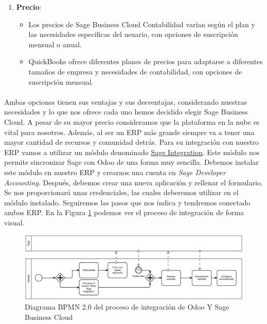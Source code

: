 \begin{enumerate}
\item \textbf{Precio}:
   \begin{itemize}
       \item Los precios de Sage Business Cloud Contabilidad varían según el plan y las necesidades específicas del usuario, con opciones de suscripción mensual o anual.
       \item QuickBooks ofrece diferentes planes de precios para adaptarse a diferentes tamaños de empresa y necesidades de contabilidad, con opciones de suscripción mensual.
   \end{itemize}

\end{enumerate}

\paragraph{}
Ambas opciones tienen sus ventajas y sus desventajas, considerando nuestras necesidades y lo que nos ofrece cada uno hemos decidido elegir Sage Business Cloud. A pesar de su mayor precio consideramos que la plataforma en la nube es vital para nosotros. Además, al ser un ERP más grande siempre va a tener una mayor cantidad de recursos y comunidad detrás. Para su integración con nuestro ERP vamos a utilizar un módulo denominado \href{https://apps.odoo.com/apps/modules/14.0/odoo_sage_integration/}{Sage Integration}. Este módulo nos permite sincronizar Sage con Odoo de una forma muy sencilla. Debemos instalar este módulo en nuestro ERP y crearnos una cuenta en \textit{Sage Developer Accounting}. Después, debemos crear una nueva aplicación y rellenar el formulario. Se nos proporcionará unas credenciales, las cuales deberemos utilizar en el módulo instalado. Seguiremos las pasos que nos indica y tendremos conectado ambos ERP.
En la Figura \ref{fico} podemos ver el proceso de integración de forma visual.

\begin{figure}
    \centering
    \includegraphics[width=1\linewidth]{imgConta/Fico.png}
    \caption{Diagrama BPMN 2.0 del proceso de integración de Odoo Y Sage Business Cloud}
    \label{fico}
\end{figure}

